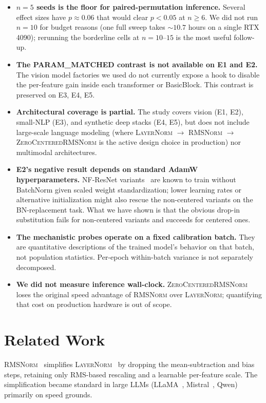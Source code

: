 \documentclass{article}
\newcommand{\rms}{\textsc{RMSNorm}}
\newcommand{\zcrms}{\textsc{ZeroCentered}\-\textsc{RMSNorm}}
\newcommand{\layernorm}{\textsc{LayerNorm}}
\begin{document}
\begin{itemize}
  \item \textbf{$n{=}5$ seeds is the floor for paired-permutation inference.} Several effect sizes have $p \approx 0.06$ that would clear $p < 0.05$ at $n \geq 6$. We did not run $n{=}10$ for budget reasons (one full sweep takes $\sim 10.7$ hours on a single RTX 4090); rerunning the borderline cells at $n{=}10$--$15$ is the most useful follow-up.
  \item \textbf{The PARAM\_MATCHED contrast is not available on E1 and E2.} The vision model factories we used do not currently expose a hook to disable the per-feature gain inside each transformer or BasicBlock. This contrast is preserved on E3, E4, E5.
  \item \textbf{Architectural coverage is partial.} The study covers vision (E1, E2), small-NLP (E3), and synthetic deep stacks (E4, E5), but does not include large-scale language modeling (where \layernorm{} $\to$ \rms{} $\to$ \zcrms{} is the active design choice in production) nor multimodal architectures.
  \item \textbf{E2's negative result depends on standard AdamW hyperparameters.} NF-ResNet variants~\citep{brock2021high} are known to train without BatchNorm given scaled weight standardization; lower learning rates or alternative initialization might also rescue the non-centered variants on the BN-replacement task. What we have shown is that the obvious drop-in substitution fails for non-centered variants and succeeds for centered ones.
  \item \textbf{The mechanistic probes operate on a fixed calibration batch.} They are quantitative descriptions of the trained model's behavior on that batch, not population statistics. Per-epoch within-batch variance is not separately decomposed.
  \item \textbf{We did not measure inference wall-clock.} \zcrms{} loses the original speed advantage of \rms{} over \layernorm{}; quantifying that cost on production hardware is out of scope.
\end{itemize}

\section{Related Work}
\label{sec:related}

\rms{}~\citep{zhang2019root} simplifies \layernorm{}~\citep{ba2016layer} by dropping the mean-subtraction and bias steps, retaining only RMS-based rescaling and a learnable per-feature scale.
The simplification became standard in large LLMs (LLaMA~\citep{touvron2023llama}, Mistral~\citep{jiang2023mistral}, Qwen) primarily on speed grounds.
\end{document}
